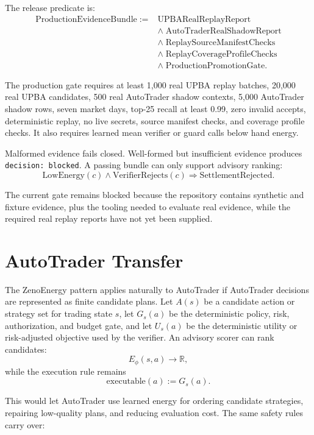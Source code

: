 \documentclass[11pt]{article}
\begin{document}
The release predicate is:
\[
\begin{aligned}
\mathrm{ProductionEvidenceBundle} := {}&
  \mathrm{UPBARealReplayReport}\\
  &\wedge\; \mathrm{AutoTraderRealShadowReport}\\
  &\wedge\; \mathrm{ReplaySourceManifestChecks}\\
  &\wedge\; \mathrm{ReplayCoverageProfileChecks}\\
  &\wedge\; \mathrm{ProductionPromotionGate}.
\end{aligned}
\]

The production gate requires at least 1,000 real UPBA replay batches, 20,000
real UPBA candidates, 500 real AutoTrader shadow contexts, 5,000 AutoTrader
shadow rows, seven market days, top-25 recall at least 0.99, zero invalid
accepts, deterministic replay, no live secrets, source manifest checks, and
coverage profile checks. It also requires learned mean verifier or guard calls
below hand energy.

Malformed evidence fails closed. Well-formed but insufficient evidence produces
\texttt{decision: blocked}. A passing bundle can only support advisory ranking:
\[
  \mathrm{LowEnergy}(c) \wedge \mathrm{VerifierRejects}(c)
  \Rightarrow \mathrm{SettlementRejected}.
\]

The current gate remains blocked because the repository contains synthetic and
fixture evidence, plus the tooling needed to evaluate real evidence, while the
required real replay reports have not yet been supplied.

\section{AutoTrader Transfer}

The ZenoEnergy pattern applies naturally to AutoTrader if AutoTrader decisions
are represented as finite candidate plans. Let $A(s)$ be a candidate action or
strategy set for trading state $s$, let $G_s(a)$ be the deterministic policy,
risk, authorization, and budget gate, and let $U_s(a)$ be the deterministic
utility or risk-adjusted objective used by the verifier. An advisory scorer can
rank candidates:
\[
  E_\phi(s,a) \rightarrow \mathbb{R},
\]
while the execution rule remains
\[
  \mathrm{executable}(a) := G_s(a).
\]

This would let AutoTrader use learned energy for ordering candidate strategies,
repairing low-quality plans, and reducing evaluation cost. The same safety
rules carry over:
\end{document}
